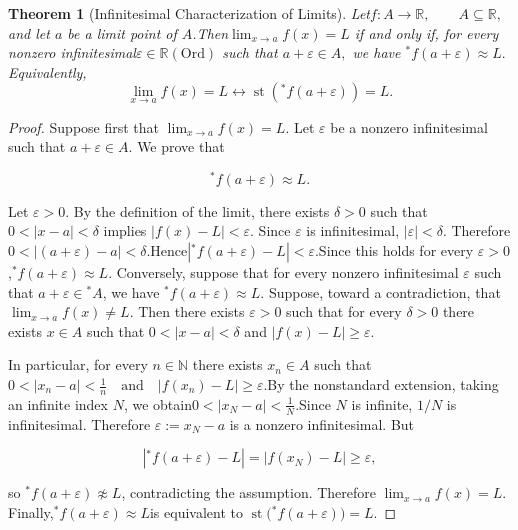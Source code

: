 \documentclass[10pt,a4paper]{book}
\newtheorem{theorem}{Theorem}[section]
\begin{document}
\begin{theorem}[Infinitesimal Characterization of Limits]
    Let$
        f:A\to\mathbb{R},
        \qquad
        A\subseteq\mathbb{R},
    $and let $a$ be a limit point of $A$.Then$\lim_{x\to a}f(x)=L$
    if and only if, for every nonzero infinitesimal$\varepsilon\in\mathbb{R}(\mathrm{Ord})$
    such that
    $a+\varepsilon\in A,$
    we have
    ${}^*f(a+\varepsilon)\approx L.$
    Equivalently,
    $$
        \lim_{x\to a}f(x)=L
        \leftrightarrow
        \operatorname{st}
        \left(
        {}^*f(a+\varepsilon)
        \right)
        =L.
    $$

\end{theorem}
\begin{proof}

    Suppose first that $\lim_{x\to a}f(x)=L$. Let $\varepsilon$ be a nonzero
    infinitesimal such that $a+\varepsilon\in A$. We prove that

    $$
        {}^*f(a+\varepsilon)\approx L.
    $$

    Let $\varepsilon>0$. By the definition of the limit, there exists $\delta>0$
    such that $0<|x-a|<\delta$ implies $|f(x)-L|<\varepsilon$. Since $\varepsilon$
    is infinitesimal, $|\varepsilon|<\delta$. Therefore
    $0<|(a+\varepsilon)-a|<\delta.$Hence$|{}^*f(a+\varepsilon)-L|<\varepsilon.$Since
    this holds for every $\varepsilon>0$,${}^*f(a+\varepsilon)\approx L.$
    Conversely, suppose that for every nonzero infinitesimal $\varepsilon$ such
    that $a+\varepsilon\in{}^*A$, we have ${}^*f(a+\varepsilon)\approx L$. Suppose,
    toward a contradiction, that $\lim_{x\to a}f(x)\neq L$. Then there exists
    $\varepsilon>0$ such that for every $\delta>0$ there exists $x\in A$ such that
    $0<|x-a|<\delta$ and $|f(x)-L|\geq\varepsilon$.

    In particular, for every $n\in\mathbb{N}$ there exists $x_n\in A$ such that$
        0<|x_n-a|<\frac1n \quad \text{and} \quad |f(x_n)-L|\geq\varepsilon. $By the
    nonstandard extension, taking an infinite index $N$, we obtain$
        0<|x_N-a|<\frac1N. $Since $N$ is infinite, $1/N$ is infinitesimal. Therefore
    $\varepsilon:=x_N-a$ is a nonzero infinitesimal. But

    $$
        |{}^*f(a+\varepsilon)-L| =  |f(x_N)-L| \geq\varepsilon,
    $$

    so ${}^*f(a+\varepsilon)\not\approx L$, contradicting the assumption. Therefore
    $\lim_{x\to a}f(x)=L$. Finally,${}^*f(a+\varepsilon)\approx L$is equivalent to
    $ \operatorname{st}\bigl({}^*f(a+\varepsilon)\bigr)=L. $

\end{proof}
\end{document}
